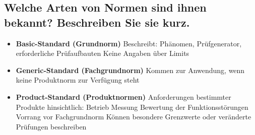 \subsection{Welche Arten von Normen sind ihnen bekannt? Beschreiben Sie sie kurz.}
\begin{itemize}
  \item \textbf{Basic-Standard (Grundnorm)}
    \subitem Beschreibt: Phänomen, Prüfgenerator, erforderliche Prüfaufbauten
    \subitem Keine Angaben über Limits
  \item \textbf{Generic-Standard (Fachgrundnorm)}
    \subitem Kommen zur Anwendung, wenn keine Produktnorm zur Verfügung steht
  \item \textbf{Product-Standard (Produktnormen)}
    \subitem Anforderungen bestimmter Produkte hinsichtlich:
      \subsubitem Betrieb
      \subsubitem Messung
      \subsubitem Bewertung der Funktionsstörungen
    \subitem Vorrang vor Fachgrundnorm
    \subitem Können besondere Grenzwerte oder veränderte Prüfungen beschreiben
\end{itemize}

\pagebreak